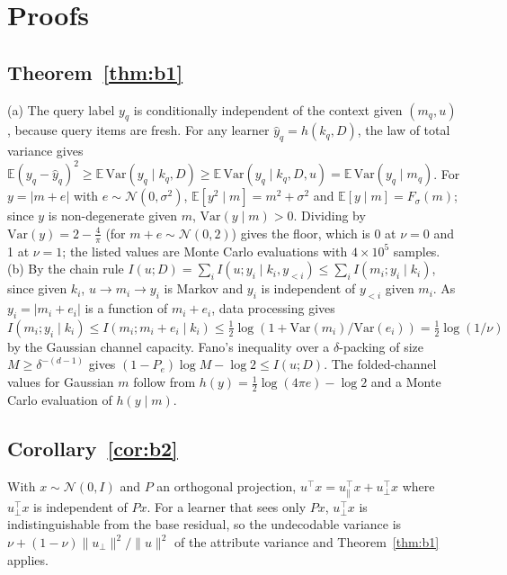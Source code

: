 \documentclass{article}
\theoremstyle{definition}
\theoremstyle{remark}
\newcommand{\Fsig}{F_{\sigma}}
\newcommand{\Ex}{\mathbb{E}}
\begin{document}



\appendix

\section{Proofs}
\label{app:proofs}

\subsection{Theorem~\ref{thm:b1}}
(a) The query label $y_q$ is conditionally independent of the context given $(m_q,u)$, because query items are fresh. For any learner $\hat y_q=h(k_q,D)$, the law of total variance gives $\Ex(y_q-\hat y_q)^2\geq\Ex\,\mathrm{Var}(y_q\mid k_q,D)\geq\Ex\,\mathrm{Var}(y_q\mid k_q,D,u)=\Ex\,\mathrm{Var}(y_q\mid m_q)$. For $y=|m+e|$ with $e\sim\mathcal N(0,\sigma^2)$, $\Ex[y^2\mid m]=m^2+\sigma^2$ and $\Ex[y\mid m]=\Fsig(m)$; since $y$ is non-degenerate given $m$, $\mathrm{Var}(y\mid m)>0$. Dividing by $\mathrm{Var}(y)=2-\tfrac{4}{\pi}$ (for $m+e\sim\mathcal N(0,2)$) gives the floor, which is 0 at $\nu=0$ and 1 at $\nu=1$; the listed values are Monte Carlo evaluations with $4\times10^5$ samples.
(b) By the chain rule $I(u;D)=\sum_iI(u;y_i\mid k_i,y_{<i})\leq\sum_iI(m_i;y_i\mid k_i)$, since given $k_i$, $u\to m_i\to y_i$ is Markov and $y_i$ is independent of $y_{<i}$ given $m_i$. As $y_i=|m_i+e_i|$ is a function of $m_i+e_i$, data processing gives $I(m_i;y_i\mid k_i)\leq I(m_i;m_i+e_i\mid k_i)\leq\tfrac12\log(1+\mathrm{Var}(m_i)/\mathrm{Var}(e_i))=\tfrac12\log(1/\nu)$ by the Gaussian channel capacity. Fano's inequality over a $\delta$-packing of size $M\geq\delta^{-(d-1)}$ gives $(1-P_e)\log M-\log2\leq I(u;D)$. The folded-channel values for Gaussian $m$ follow from $h(y)=\tfrac12\log(4\pi e)-\log2$ and a Monte Carlo evaluation of $h(y\mid m)$.

\subsection{Corollary~\ref{cor:b2}}
With $x\sim\mathcal N(0,I)$ and $P$ an orthogonal projection, $u^\top x=u_\parallel^\top x+u_\perp^\top x$ where $u_\perp^\top x$ is independent of $Px$. For a learner that sees only $Px$, $u_\perp^\top x$ is indistinguishable from the base residual, so the undecodable variance is $\nu+(1-\nu)\|u_\perp\|^2/\|u\|^2$ of the attribute variance and Theorem~\ref{thm:b1} applies.
\end{document}
